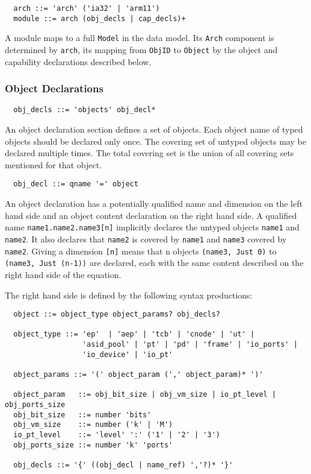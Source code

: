 \documentclass[a4paper,11pt]{article}
\begin{document}
\begin{verbatim}
  arch ::= 'arch' ('ia32' | 'arm11') 
  module ::= arch (obj_decls | cap_decls)+ 
\end{verbatim}

A module maps to a full \texttt{Model} in the data model. Its \texttt{Arch} component is determined by \texttt{arch}, its mapping from \texttt{ObjID} to \texttt{Object} by the object and capability declarations described below.


\subsubsection{Object Declarations}

\begin{verbatim}
  obj_decls ::= 'objects' obj_decl*
\end{verbatim}

An object declaration section defines a set of objects. Each object name of typed objects should be declared only once. The covering set of untyped objects may be declared multiple times. The total covering set is the union of all covering sets mentioned for that object.

\begin{verbatim}
  obj_decl ::= qname '=' object
\end{verbatim}

An object declaration has a potentially qualified name and dimension on the left hand side and an object content declaration on the right hand side. A qualified name \texttt{name1.name2.name3[n]} implicitly declares the untyped objects \texttt{name1} and \texttt{name2}. It also declares that \texttt{name2} is covered by \texttt{name1} and \texttt{name3} covered by \texttt{name2}. Giving a dimension \texttt{[n]} means that n objects \texttt{(name3, Just 0)} to \texttt{(name3, Just (n-1))} are declared, each with the same content described on the right hand side of the equation.

The right hand side is defined by the following syntax productions:

\begin{verbatim}
  object ::= object_type object_params? obj_decls?

  object_type ::= 'ep'  | 'aep' | 'tcb' | 'cnode' | 'ut' | 
                  'asid_pool' | 'pt' | 'pd' | 'frame' | 'io_ports' |
                  'io_device' | 'io_pt' 

  object_params ::= '(' object_param (',' object_param)* ')'

  object_param   ::= obj_bit_size | obj_vm_size | io_pt_level | obj_ports_size
  obj_bit_size   ::= number 'bits'
  obj_vm_size    ::= number ('k' | 'M')
  io_pt_level    ::= 'level' ':' ('1' | '2' | '3')
  obj_ports_size ::= number 'k' 'ports'

  obj_decls ::= '{' ((obj_decl | name_ref) ','?)* '}'
\end{verbatim}
\end{document}
